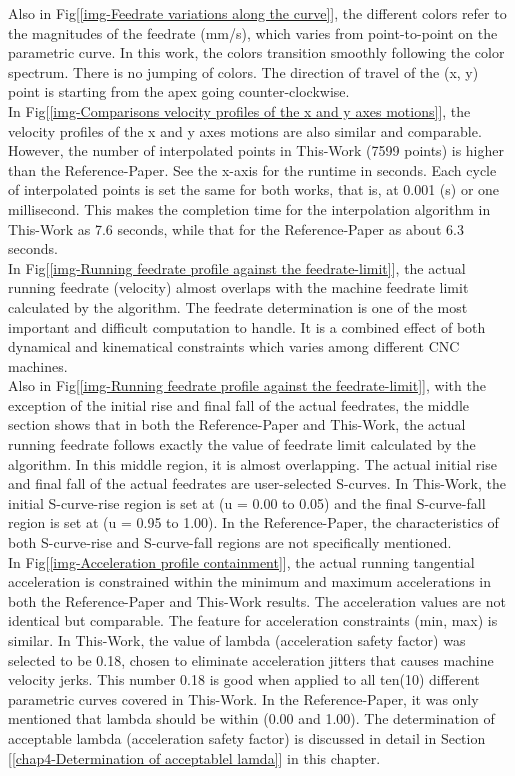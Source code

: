 \noindent
Also in Fig[\ref{img-Feedrate variations along the curve}], the different colors refer to the magnitudes of the feedrate (mm/s), which varies from point-to-point on the parametric curve. In this work, the colors transition smoothly following the color spectrum. There is no jumping of colors. The direction of travel of the (x, y) point is starting from the apex going counter-clockwise. \\

\noindent 
In Fig[\ref{img-Comparisons velocity profiles of the x and y axes motions}], the velocity profiles of the x and y axes motions are also similar and comparable. However, the number of interpolated points in This-Work (7599 points) is higher than the Reference-Paper. See the x-axis for the runtime in seconds. Each cycle of interpolated points is set the same for both works, that is, at 0.001 (s) or one millisecond. This makes the completion time for the interpolation algorithm in This-Work as 7.6 seconds, while that for the Reference-Paper as about 6.3 seconds.\\   

\noindent
In Fig[\ref{img-Running feedrate profile against the feedrate-limit}], the actual running feedrate (velocity) almost overlaps with the machine feedrate limit calculated by the algorithm. The feedrate determination is one of the most important and difficult computation to handle. It is a combined effect of both dynamical and kinematical constraints which varies among different CNC machines. \\

\noindent 
Also in Fig[\ref{img-Running feedrate profile against the feedrate-limit}], with the exception of the initial rise and final fall of the actual feedrates, the middle section shows that in both the Reference-Paper and This-Work, the actual running feedrate follows exactly the value of feedrate limit calculated by the algorithm. In this middle region, it is almost overlapping. The actual initial rise and final fall of the actual feedrates are user-selected S-curves. In This-Work, the initial S-curve-rise region is set at (u = 0.00 to 0.05) and the final S-curve-fall region is set at (u = 0.95 to 1.00). In the Reference-Paper, the characteristics of both S-curve-rise and S-curve-fall regions are not specifically mentioned. \\

\noindent
In Fig[\ref{img-Acceleration profile containment}], the actual running tangential acceleration is constrained within the minimum and maximum accelerations in both the Reference-Paper and This-Work results. The acceleration values are not identical but comparable. The feature for acceleration constraints (min, max) is similar. In This-Work, the value of lambda (acceleration safety factor) was selected to be 0.18, chosen to eliminate acceleration jitters that causes machine velocity jerks. This number 0.18 is good when applied to all ten(10) different parametric curves covered in This-Work. In the Reference-Paper, it was only mentioned that lambda should be within (0.00 and 1.00). The determination of acceptable lambda (acceleration safety factor) is discussed in detail in Section [\ref{chap4-Determination of acceptablel lamda}] in this chapter.  

